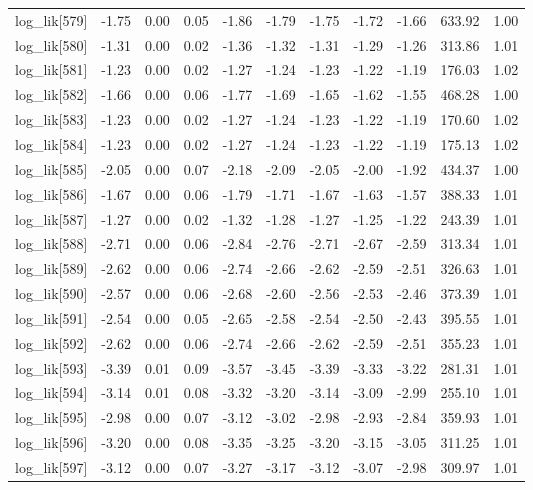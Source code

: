 \begin{table}[ht]
\begin{tabular}{rrrrrrrrrrr}
  log\_lik[579] & -1.75 & 0.00 & 0.05 & -1.86 & -1.79 & -1.75 & -1.72 & -1.66 & 633.92 & 1.00 \\ 
  log\_lik[580] & -1.31 & 0.00 & 0.02 & -1.36 & -1.32 & -1.31 & -1.29 & -1.26 & 313.86 & 1.01 \\ 
  log\_lik[581] & -1.23 & 0.00 & 0.02 & -1.27 & -1.24 & -1.23 & -1.22 & -1.19 & 176.03 & 1.02 \\ 
  log\_lik[582] & -1.66 & 0.00 & 0.06 & -1.77 & -1.69 & -1.65 & -1.62 & -1.55 & 468.28 & 1.00 \\ 
  log\_lik[583] & -1.23 & 0.00 & 0.02 & -1.27 & -1.24 & -1.23 & -1.22 & -1.19 & 170.60 & 1.02 \\ 
  log\_lik[584] & -1.23 & 0.00 & 0.02 & -1.27 & -1.24 & -1.23 & -1.22 & -1.19 & 175.13 & 1.02 \\ 
  log\_lik[585] & -2.05 & 0.00 & 0.07 & -2.18 & -2.09 & -2.05 & -2.00 & -1.92 & 434.37 & 1.00 \\ 
  log\_lik[586] & -1.67 & 0.00 & 0.06 & -1.79 & -1.71 & -1.67 & -1.63 & -1.57 & 388.33 & 1.01 \\ 
  log\_lik[587] & -1.27 & 0.00 & 0.02 & -1.32 & -1.28 & -1.27 & -1.25 & -1.22 & 243.39 & 1.01 \\ 
  log\_lik[588] & -2.71 & 0.00 & 0.06 & -2.84 & -2.76 & -2.71 & -2.67 & -2.59 & 313.34 & 1.01 \\ 
  log\_lik[589] & -2.62 & 0.00 & 0.06 & -2.74 & -2.66 & -2.62 & -2.59 & -2.51 & 326.63 & 1.01 \\ 
  log\_lik[590] & -2.57 & 0.00 & 0.06 & -2.68 & -2.60 & -2.56 & -2.53 & -2.46 & 373.39 & 1.01 \\ 
  log\_lik[591] & -2.54 & 0.00 & 0.05 & -2.65 & -2.58 & -2.54 & -2.50 & -2.43 & 395.55 & 1.01 \\ 
  log\_lik[592] & -2.62 & 0.00 & 0.06 & -2.74 & -2.66 & -2.62 & -2.59 & -2.51 & 355.23 & 1.01 \\ 
  log\_lik[593] & -3.39 & 0.01 & 0.09 & -3.57 & -3.45 & -3.39 & -3.33 & -3.22 & 281.31 & 1.01 \\ 
  log\_lik[594] & -3.14 & 0.01 & 0.08 & -3.32 & -3.20 & -3.14 & -3.09 & -2.99 & 255.10 & 1.01 \\ 
  log\_lik[595] & -2.98 & 0.00 & 0.07 & -3.12 & -3.02 & -2.98 & -2.93 & -2.84 & 359.93 & 1.01 \\ 
  log\_lik[596] & -3.20 & 0.00 & 0.08 & -3.35 & -3.25 & -3.20 & -3.15 & -3.05 & 311.25 & 1.01 \\ 
  log\_lik[597] & -3.12 & 0.00 & 0.07 & -3.27 & -3.17 & -3.12 & -3.07 & -2.98 & 309.97 & 1.01 \\ 

\end{tabular}
\end{table}
